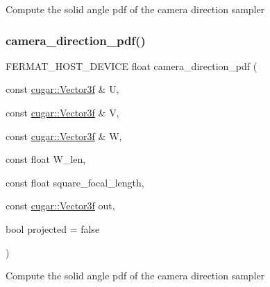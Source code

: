 Compute the solid angle pdf of the camera direction sampler \mbox{\label{group___camera_module_gadec496beaacfcaa8c49eea4217ee4476}} 
\subsubsection{\texorpdfstring{camera\+\_\+direction\+\_\+pdf()}{camera\_direction\_pdf()}\hspace{0.1cm}{\footnotesize\ttfamily [2/2]}}
{\footnotesize\ttfamily F\+E\+R\+M\+A\+T\+\_\+\+H\+O\+S\+T\+\_\+\+D\+E\+V\+I\+CE float camera\+\_\+direction\+\_\+pdf (\begin{DoxyParamCaption}\item[{const \hyperlink{structcugar_1_1_vector}{cugar\+::\+Vector3f} \&}]{U,  }\item[{const \hyperlink{structcugar_1_1_vector}{cugar\+::\+Vector3f} \&}]{V,  }\item[{const \hyperlink{structcugar_1_1_vector}{cugar\+::\+Vector3f} \&}]{W,  }\item[{const float}]{W\+\_\+len,  }\item[{const float}]{square\+\_\+focal\+\_\+length,  }\item[{const \hyperlink{structcugar_1_1_vector}{cugar\+::\+Vector3f}}]{out,  }\item[{bool}]{projected = {\ttfamily false} }\end{DoxyParamCaption})\hspace{0.3cm}{\ttfamily [inline]}}

Compute the solid angle pdf of the camera direction sampler \mbox{\label{group___camera_module_gaac6a57c4883a499e09399d5f617eccaf}} 
